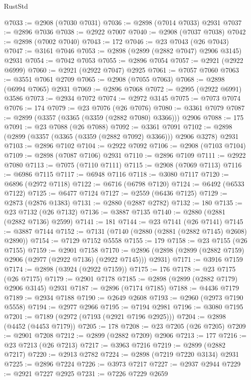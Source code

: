 \begin{lexlean}{RustStd}
\begin{coremodule}
@7033 := @2908 (@7030 @7031)
@7036 := @2898 (@7014 @7033) @2931
@7037 := @2896 @7036
@7038 := @2922 @7007
@7040 := @2908 (@7037 @7038)
@7042 := @2898 (@7002 @7040)
@7043 := 172
@7046 := @23 @7043 (@26 @7043)
@7047 := @3161 @7046
@7053 := @2898 (@2899 (@2882 @7047) @2906 @3145) @2931
@7054 := @7042 @7053
@7055 := @2896 @7054
@7057 := @2921 (@2922 @6999)
@7060 := @2921 (@2922 @7047) @2925
@7061 := @7057 @7060
@7063 := @3551 @7061 @2709
@7065 := @2908 (@7055 @7063)
@7068 := @2898 (@6994 @7065) @2931
@7069 := @2896 @7068
@7072 := @2995 (@2922 @6991) @3586
@7073 := @2934 @7072
@7074 := @2972 @3145
@7075 := @7073 @7074
@7076 := 174
@7079 := @23 @7076 (@26 @7076)
@7080 := @3361 @7079
@7087 := @2899 (@3357 (@3365 (@3359 (@2882 @7080) @3366))) @2906
@7088 := 175
@7091 := @23 @7088 (@26 @7088)
@7092 := @3361 @7091
@7102 := @2898 (@2899 (@3357 (@3365 (@3359 (@2882 @7092) @3366))) @2906 @3278) @2931
@7103 := @2896 @7102
@7104 := @2922 @7092
@7106 := @2908 (@7103 @7104)
@7109 := @2898 (@7087 @7106) @2931
@7110 := @2896 @7109
@7111 := @2922 @7080
@7113 := @7075 (@7110 @7111)
@7115 := @2908 (@7069 @7113)
@7116 := @6986 @7115
@7117 := @6948 @7116
@7118 := @3080 @7117
@7120 := @6896 (@2972 @7118)
@7122 := @6716 (@6798 @7120)
@7124 := @6492 (@6533 @7122)
@7125 := @6477 @7124
@7127 := @2559 (@6436 @7125)
@7129 := @2873 (@2876 @1383)
@7131 := @2880 (@2887 @2782)
@7132 := 180
@7135 := @23 @7132 (@26 @7132)
@7136 := @3887 @7135
@7140 := @2880 (@2881 (@2882 @7136) @2599)
@7141 := 181
@7144 := @23 @7141 (@26 @7141)
@7145 := @3887 @7144
@7152 := @7131 (@7140 (@2880 (@2881 (@2882 @7145) @2608) @2890))
@7154 := @7129 @7152 @5558
@7155 := 179
@7158 := @23 @7155 (@26 @7155)
@7159 := @2901 @7158
@7170 := @2896 (@2898 (@2899 (@2882 @7159) @2906 (@2977 (@2922 @7136) (@2922 @7145))) @2931)
@7171 := @3916 @7159
@7174 := @2898 (@3924 (@2922 @7159))
@7175 := 176
@7178 := @23 @7175 (@26 @7175)
@7179 := @2901 @7178
@7185 := @2898 (@2899 (@2882 @7179) @2906 @3145) @2931
@7187 := @2896 (@7174 @7185)
@7188 := @4436 @7179
@7189 := @2934 @7188
@7190 := @2649 @2608
@7193 := @2960 (@2973 @7190 @5558)
@7194 := @2977 @2966
@7195 := @7194 @2981
@7196 := @3080 @7195
@7201 := @7189 (@2972 (@7193 (@2921 @7196 @2925)))
@7204 := @2898 (@4452 (@4453 @7179))
@7205 := 178
@7208 := @23 @7205 (@26 @7205)
@7209 := @2901 @7208
@7212 := @2899 (@2882 @7209) @2906
@7213 := 177
@7216 := @23 @7213 (@26 @7213)
@7217 := @3963 @7216
@7219 := @2899 (@2882 @7217)
@7220 := @2913 @2782
@7224 := @2898 (@7219 @7220 @3134) @2931
@7225 := @2896 @7224
@7226 := @3973 @7217
@7227 := @2937 @2944
@7229 := @2921 @7227 @2925
@7231 := @7226 @7229 @2659

\end{coremodule}
\end{lexlean}
